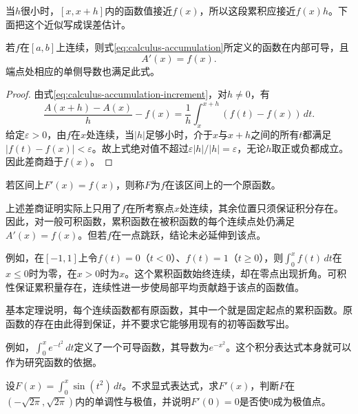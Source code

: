 当\(h\)很小时，\([x,x+h]\)内的函数值接近\(f(x)\)，所以这段累积应接近\(f(x)h\)。下面把这个近似写成误差估计。

\begin{theorem}[微积分基本定理]\label{thm:calculus-ftc-derivative}
若\(f\)在\([a,b]\)上连续，则式\eqref{eq:calculus-accumulation}所定义的函数在内部可导，且
\begin{equation*}
 A'(x)=f(x).
\end{equation*}
端点处相应的单侧导数也满足此式。
\end{theorem}

\begin{proof}
由式\eqref{eq:calculus-accumulation-increment}，对\(h\ne0\)，有
\begin{equation*}
 \frac{A(x+h)-A(x)}h-f(x)
 =\frac1h\int_x^{x+h}(f(t)-f(x))\,dt.
\end{equation*}
给定\(\varepsilon>0\)，由\(f\)在\(x\)处连续，当\(|h|\)足够小时，介于\(x\)与\(x+h\)之间的所有\(t\)都满足\(|f(t)-f(x)|<\varepsilon\)。故上式绝对值不超过\(\varepsilon|h|/|h|=\varepsilon\)，无论\(h\)取正或负都成立。因此差商趋于\(f(x)\)。
\end{proof}

\begin{definition}
若区间上\(F'(x)=f(x)\)，则称\(F\)为\(f\)在该区间上的一个{\heiti{}原函数}。
\end{definition}

上述差商证明实际上只用了\(f\)在所考察点\(x\)处连续，其余位置只须保证积分存在。因此，对一般可积函数，累积函数在被积函数的每个连续点处仍满足\(A'(x)=f(x)\)。但若\(f\)在一点跳跃，结论未必延伸到该点。

例如，在\([-1,1]\)上令\(f(t)=0\)（\(t<0\)）、\(f(t)=1\)（\(t\ge0\)），则\(\int_0^xf(t)\,dt\)在\(x\le0\)时为零，在\(x>0\)时为\(x\)。这个累积函数始终连续，却在零点出现折角。可积性保证累积量存在，连续性进一步使局部平均贡献趋于该点的函数值。

基本定理说明，每个连续函数都有原函数，其中一个就是固定起点的累积函数。原函数的存在由此得到保证，并不要求它能够用现有的初等函数写出。

例如，\(\int_0^x e^{-t^2}\,dt\)定义了一个可导函数，其导数为\(e^{-x^2}\)。这个积分表达式本身就可以作为研究函数的依据。

\begin{example}
设\(F(x)=\int_0^x\sin(t^2)\,dt\)。不求显式表达式，求\(F'(x)\)，判断\(F\)在\((-\sqrt{2\pi},\sqrt{2\pi})\)内的单调性与极值，并说明\(F'(0)=0\)是否使\(0\)成为极值点。
\end{example}

